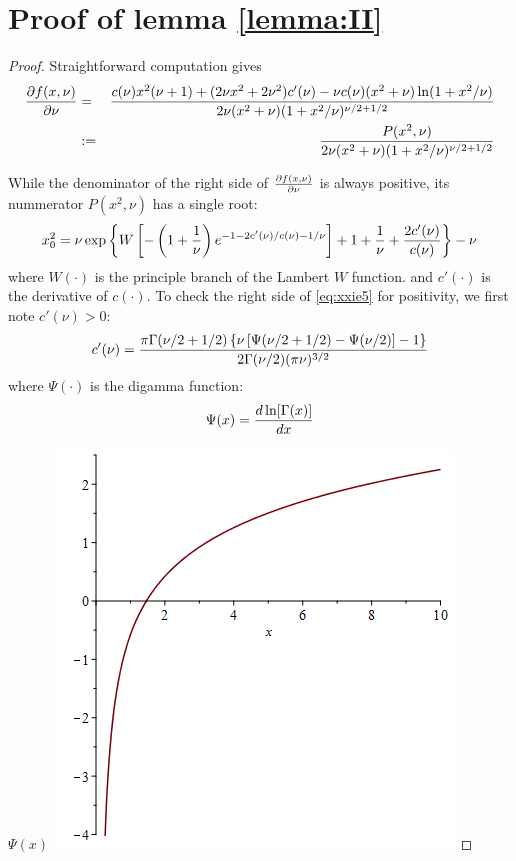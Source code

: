 \documentclass[11pt,a4]{amsart}
\newcommand{\pd}{\partial}
\newcommand{\1}{{\mathbf 1}}
\begin{document}
\section{Proof of lemma \ref{lemma:II}}
\begin{proof}
  Straightforward computation gives
  \begin{eqnarray}
    {\pd f(x, \nu) \over \pd \nu} &=& {
      c(\nu) x^2 (\nu + 1) + (2 \nu x^2 + 2 \nu^2) c'(\nu)
      -
      \nu c(\nu) (x^2 + \nu) \ln(1 + x^2/\nu)
      \over
      2 \nu (x^2 + \nu) (1 + x^2 / \nu)^{\nu/2 + 1/2}
    } \nonumber \\
    &:=& {
      P(x^2, \nu)
      \over
      2 \nu (x^2 + \nu) (1 + x^2 / \nu)^{\nu/2 + 1/2}
    }
    \label{eq:xxie4.1}
  \end{eqnarray}

  While the denominator of the right side of ${\pd f(x, \nu) \over \pd \nu}$ is
  always positive, its nummerator $P(x^2, \nu)$ has a single root:
  \begin{equation}
    \label{eq:xxie5}
    x_0^2 = \nu\exp\left\{
      W\left[
        -\left(1 + {1 \over \nu}\right)
        e^{-1 - 2 c'(\nu)/c(\nu) - 1/\nu}
      \right]
      + 1 + {1 \over \nu} + {2 c'(\nu) \over c(\nu)}
    \right\} - \nu
  \end{equation}
  where $W(\cdot)$ is the principle branch of the Lambert $W$
  function. and $c'(\cdot)$ is the derivative of $c(\cdot)$. To check
  the right side of \eqref{eq:xxie5} for positivity, we first note
  $c'(\nu) > 0$:
  \[
  c'(\nu) = {
    \pi \Gamma(\nu/2 + 1/2) \left\{
      \nu \left[ \Psi(\nu/2 + 1/2) - \Psi(\nu/2)\right] - 1
    \right\}
    \over
    2 \Gamma(\nu/2) (\pi \nu)^{3/2}
  }
  \]
  where $\Psi(\cdot)$ is the digamma function:
  \[
  \Psi(x) = {d \ln[\Gamma(x)] \over d x}
  \]
  \begin{minipage}{0.48\textwidth}
    $\Psi(x)$ \linebreak
    \includegraphics[width=\textwidth]{digamma.png}

\end{minipage}
\end{proof}
\end{document}
